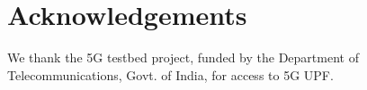 \section*{Acknowledgements}
We thank the 5G testbed project, funded by the Department of Telecommunications, Govt. of India, for access to 5G UPF.

\vspace{-9mm}